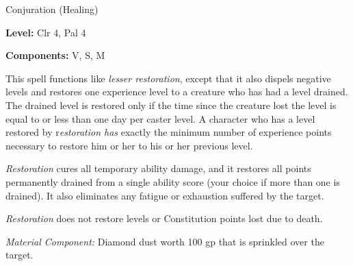 
Conjuration (Healing)

\textbf{Level:} Clr 4, Pal 4

\textbf{Components:} V, S, M

This spell functions like \textit{lesser restoration}, except that it also dispels 
negative levels and restores one experience level to a creature who has had a level 
drained. The drained level is restored only if the time since the creature lost 
the level is equal to or less than one day per caster level. A character who has 
a level restored by r\textit{estoration has} exactly the minimum number of experience 
points necessary to restore him or her to his or her previous level.

\textit{Restoration} cures all temporary ability damage, and it restores all points 
permanently drained from a single ability score (your choice if more than one is 
drained). It also eliminates any fatigue or exhaustion suffered by the target. 

\textit{Restoration} does not restore levels or Constitution points lost due to 
death.

\textit{Material Component:} Diamond dust worth 100 gp that is sprinkled over the 
target.


